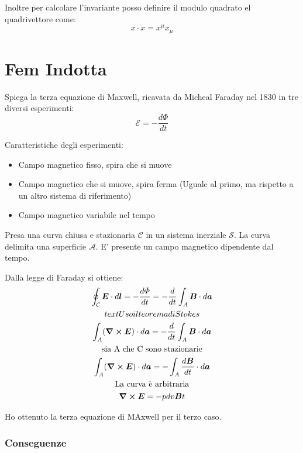 \documentclass[a4paper]{scrarticle}
\begin{document}
Inoltre per calcolare l'invariante posso definire il modulo quadrato el quadrivettore come:
\begin{equation}
    x \cdot x = x^\mu x_\mu
\end{equation}

\section{Fem Indotta}


Spiega la terza equazione di Maxwell, ricavata da Micheal Faraday nel 1830 in tre diversi esperimenti: 
\begin{equation}
    \mathcal{E} = -\frac{d \varPhi}{dt}
\end{equation}

Caratteristiche degli esperimenti:
\begin{itemize}
    \item Campo magnetico fisso, spira che si muove
    \item Campo magnetico che si muove, spira ferma (Uguale al primo, ma rispetto a un altro sistema di riferimento)
    \item Campo magnetico variabile nel tempo
\end{itemize}

Presa una curva chiusa e stazionaria $\mathcal{C}$ in un sistema inerziale $\mathcal{S}$. La curva delimita una superficie $\mathcal{A}$. E' presente un campo magnetico dipendente dal tempo.

Dalla legge di Faraday si ottiene:
\begin{gather*}
    \oint_\mathcal{C} \bm E \cdot d\bm l = - \frac{d \varPhi}{dt} = - \frac{d}{dt} \int_A \bm B \cdot d\bm a\\
    text{Uso il teorema di Stokes}\\
    \int_A (\curl \bm E)\cdot d\bm a = - \frac{d}{dt} \int_A \bm B \cdot d\bm a\\
    \text{sia A che C sono stazionarie}\\
    \int_A (\curl \bm E)\cdot d\bm a = -  \int_A \frac{d\bm B}{dt} \cdot d\bm a\\
    \text{La curva è arbitraria}\\
    \curl \bm E = - pdv{\bm B}{t}
\end{gather*}

Ho ottenuto la terza equazione di MAxwell per il terzo caso.

\subsubsection*{Conseguenze}
\end{document}
